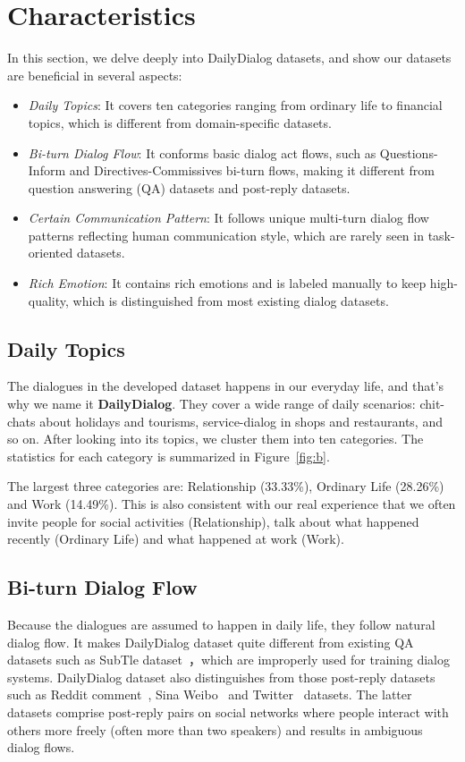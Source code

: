 \documentclass[11pt,letterpaper]{article}
\begin{document}
\section{Characteristics}
\label{sec:char}
In this section, we delve deeply into DailyDialog datasets, and show our datasets are beneficial in several aspects:
\begin{itemize}
\item \emph{Daily Topics}: It covers ten categories ranging from ordinary life to financial topics, which is different from domain-specific datasets.
\item \emph{Bi-turn Dialog Flow}: It conforms basic dialog act flows, such as Questions-Inform and Directives-Commissives bi-turn flows, making it different from question answering (QA) datasets and post-reply datasets.
\item \emph{Certain Communication Pattern}: It follows unique multi-turn dialog flow patterns reflecting human communication style, which are rarely seen in task-oriented datasets.
\item \emph{Rich Emotion}: It contains rich emotions and is labeled manually to keep high-quality, which is distinguished from most existing dialog datasets.
\end{itemize}

\subsection{Daily Topics}
The dialogues in the developed dataset happens in our everyday life, and that's why we name it \textbf{DailyDialog}. They cover a wide range of daily scenarios: chit-chats about holidays and tourisms, service-dialog in shops and restaurants, and so on. After looking into its topics, we cluster them into ten categories. The statistics for each category is summarized in Figure~\ref{fig:b}.

The largest three categories are: Relationship (33.33\%), Ordinary Life (28.26\%) and Work (14.49\%). This is also consistent with our real experience that we often invite people for social activities (Relationship), talk about what happened recently (Ordinary Life) and what happened at work (Work). 

\subsection{Bi-turn Dialog Flow}
Because the dialogues are assumed to happen in daily life, they follow natural dialog flow. It makes DailyDialog dataset quite different from existing QA datasets such as SubTle dataset~\cite{moviedialog}，which are improperly used for training dialog systems. DailyDialog dataset also distinguishes from those post-reply datasets such as Reddit comment~\cite{reddit}, Sina Weibo~\cite{Shang2015NeuralRM} and Twitter~\cite{twitter} datasets. The latter datasets comprise post-reply pairs on social networks where people interact with others more freely (often more than two speakers) and results in ambiguous dialog flows. 
\end{document}
